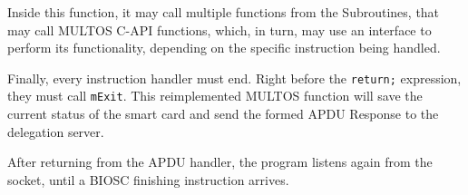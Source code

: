 Inside this function, it may call multiple functions from the Subroutines, that may call MULTOS C-API functions, which, in turn, may use an interface to perform its functionality, depending on the specific instruction being handled.

Finally, every instruction handler must end. Right before the \texttt{return;} expression, they must call \texttt{mExit}. This reimplemented MULTOS function will save the current status of the smart card and send the formed APDU Response to the delegation server.

After returning from the APDU handler, the program listens again from the socket, until a BIOSC finishing instruction arrives.


